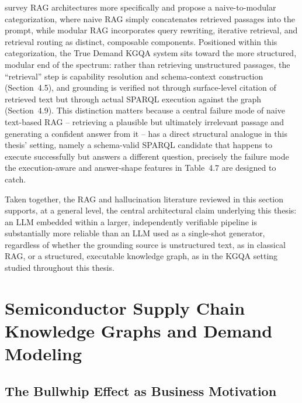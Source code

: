 \documentclass[
  12pt,
  english,
  oneside]{report}
\begin{document}
\citet{gao2023retrieval} survey RAG architectures more specifically and
propose a naive-to-modular categorization, where naive RAG simply
concatenates retrieved passages into the prompt, while modular RAG
incorporates query rewriting, iterative retrieval, and retrieval routing as
distinct, composable components. Positioned within this categorization, the
True Demand KGQA system sits toward the more structured, modular end of
the spectrum: rather than retrieving unstructured passages, the ``retrieval''
step is capability resolution and schema-context construction
(Section~4.5), and grounding is verified not through surface-level citation
of retrieved text but through actual SPARQL execution against the graph
(Section~4.9). This distinction matters because a central failure mode of
naive text-based RAG -- retrieving a plausible but ultimately irrelevant
passage and generating a confident answer from it -- has a direct structural
analogue in this thesis' setting, namely a schema-valid SPARQL candidate
that happens to execute successfully but answers a different question,
precisely the failure mode the execution-aware and answer-shape features in
Table~4.7 are designed to catch.

Taken together, the RAG and hallucination literature reviewed in this
section supports, at a general level, the central architectural claim
underlying this thesis: an LLM embedded within a larger, independently
verifiable pipeline is substantially more reliable than an LLM used as a
single-shot generator, regardless of whether the grounding source is
unstructured text, as in classical RAG, or a structured, executable
knowledge graph, as in the KGQA setting studied throughout this thesis.

\section{Semiconductor Supply Chain Knowledge Graphs and Demand Modeling}
\label{sec:domain-detailed}

\subsection{The Bullwhip Effect as Business Motivation}
\end{document}
